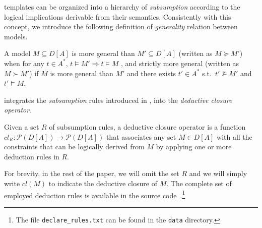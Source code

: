 \declare templates can be organized into a hierarchy of \emph{subsumption} \cite{2017-DiCiccio} according to the logical implications derivable from their semantics. Consistently with this concept, we introduce the following definition of \emph{generality} relation between models.
\begin{definition}{}\label{def:subs}
A model $M\subseteq D[A]$ is more general than $M'\subseteq D[A]$ (written as $M \succeq M'$) when for any $t\in A^*$, $t\models M' \Rightarrow t\models M$ , and strictly more general (written as $M \succ M'$) if $M$ is more general than $M'$ and there exists $t'\in A^*$ s.t.\ $t'\not\models M'$ and $t'\models M$.
\end{definition}

\nd integrates the \emph{subsumption} rules introduced in \cite{2017-DiCiccio}, into the \emph{deductive closure operator}.

\begin{definition}{}
Given a set $R$ of subsumption rules, a deductive closure operator is a function $cl_R: \mathcal{P}(D[A])\rightarrow\mathcal{P}(D[A])$ that associates any set $M \in D[A]$ with all the constraints that can be logically derived from $M$ by applying one or more deduction rules in $R$.
\end{definition}
For brevity, in the rest of the paper, we will omit the set $R$ and we will simply write $cl(M)$ to indicate the deductive closure of $M$. The complete set of employed deduction rules is available in the source code~\cite{zenodo:experiments}.\footnote{The file \texttt{declare\_rules.txt} can be found in the%
\texttt{data} directory.}%




